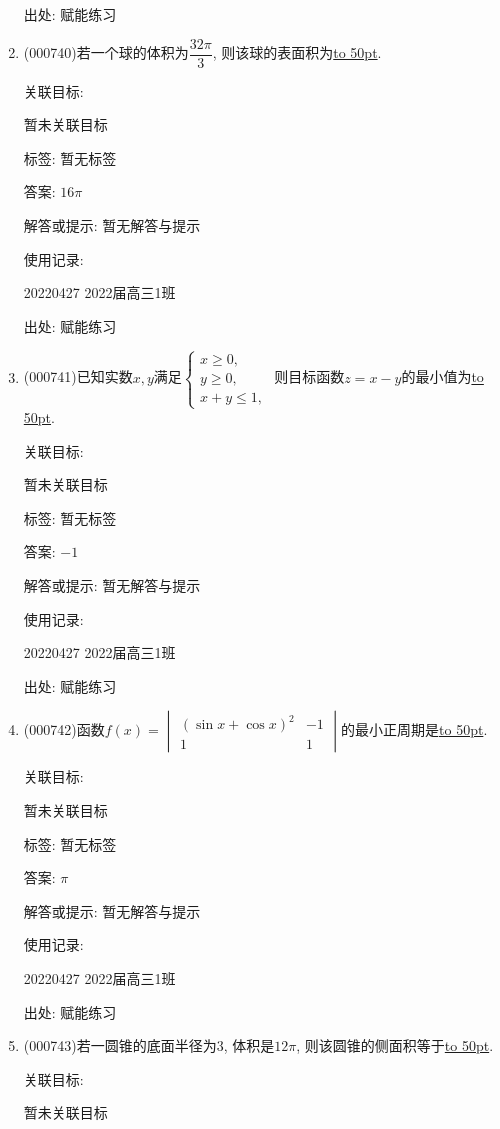 \documentclass[10pt,a4paper]{article}
\newcommand{\blank}[1]{\underline{\hbox to #1pt{}}}
\begin{document}
\begin{enumerate}[1.]
出处: 赋能练习
\item { (000740)}若一个球的体积为$\dfrac{32\pi}3$, 则该球的表面积为\blank{50}.


关联目标:

暂未关联目标



标签: 暂无标签

答案: $16\pi$

解答或提示: 暂无解答与提示

使用记录:

20220427	2022届高三1班	


出处: 赋能练习
\item { (000741)}已知实数$x,y$满足$\begin{cases} x\ge 0, \\ y\ge 0, \\ x+y\le 1, \end{cases}$ 则目标函数$z=x-y$的最小值为\blank{50}.


关联目标:

暂未关联目标



标签: 暂无标签

答案: $-1$

解答或提示: 暂无解答与提示

使用记录:

20220427	2022届高三1班	


出处: 赋能练习
\item { (000742)}函数$f(x)=\begin{vmatrix} (\sin x+\cos x)^2 & -1 \\ 1 & 1 \end{vmatrix}$的最小正周期是\blank{50}.


关联目标:

暂未关联目标



标签: 暂无标签

答案: $\pi$

解答或提示: 暂无解答与提示

使用记录:

20220427	2022届高三1班	


出处: 赋能练习
\item { (000743)}若一圆锥的底面半径为$3$, 体积是$12\pi$, 则该圆锥的侧面积等于\blank{50}.


关联目标:

暂未关联目标




\end{enumerate}
\end{document}
